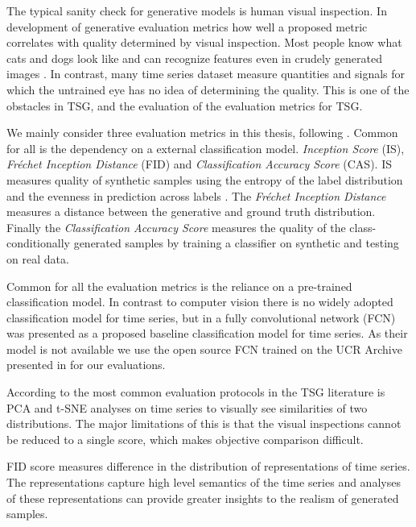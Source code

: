\documentclass[../../thesis.tex]{subfiles}
\begin{document}
The typical sanity check for generative models is human visual inspection. In development of generative evaluation metrics how well a proposed metric correlates with quality determined by visual inspection. Most people know what cats and dogs look like and can recognize features even in crudely generated images . In contrast, many time series dataset measure quantities and signals for which the untrained eye has no idea of determining the quality. This is one of the obstacles in TSG, and the evaluation of the evaluation metrics for TSG. \newline 

We mainly consider three evaluation metrics in this thesis, following \cite{TimeVQVAE}. Common for all is the dependency on a external classification model. \textit{Inception Score} (IS), \textit{Fréchet Inception Distance} (FID) and \textit{Classification Accuracy Score} (CAS).
IS measures quality of synthetic samples using the entropy of the label distribution and the evenness in prediction across labels . The \textit{Fréchet Inception Distance} measures a distance between the generative and ground truth distribution. Finally the \textit{Classification Accuracy Score} measures the quality of the class-conditionally generated samples by training a classifier on synthetic and testing on real data.

Common for all the evaluation metrics is the reliance on a pre-trained classification model. In contrast to computer vision there is no widely adopted classification model for time series, but in \cite{wang2016time} a fully convolutional network (FCN) was presented as a proposed baseline classification model for time series. As their model is not available we use the open source FCN trained on the UCR Archive presented in \cite{TimeVQVAE} for our evaluations. \newline


According to \cite{TimeVQVAE} the most common evaluation protocols in the TSG literature is PCA and t-SNE analyses on time series to visually see similarities of two distributions. The major limitations of this is that the visual inspections cannot be reduced to a single score, which makes objective comparison difficult. \newline


FID score measures difference in the distribution of representations of time series. The representations capture high level semantics of the time series and analyses of these representations can provide greater insights to the realism of generated samples. \newline
\end{document}
